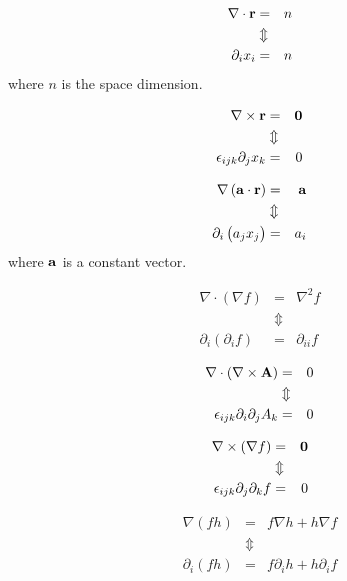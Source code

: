\begin{eqnarray}
\nabla\cdot\mathbf{ r} & = & n\nonumber \\
 & \Updownarrow\\
\partial_{i}x_{i} & = & n\nonumber
\end{eqnarray}
where $n$ is the space dimension.


\begin{eqnarray}
\nabla\times\mathbf{ r} & = & \mathbf{ 0}\nonumber \\
 & \Updownarrow\\
\epsilon_{ijk}\partial_{j}x_{k} & = & 0\nonumber
\end{eqnarray}



\begin{eqnarray}
\nabla\left(\mathbf{ a}\cdot\mathbf{ r}\right) & = & \mathbf{ a}\nonumber \\
 & \Updownarrow\\
\partial_{i}\left(a_{j}x_{j}\right) & = & a_{i}\nonumber
\end{eqnarray}
where $\mathbf{ a}$ is a constant vector.


\begin{eqnarray}
\nabla\cdot\left(\nabla f\right) & = & \nabla^{2}f\nonumber \\
 & \Updownarrow\\
\partial_{i}\left(\partial_{i}f\right) & = & \partial_{ii}f\nonumber
\end{eqnarray}



\begin{eqnarray}
\nabla\cdot\left(\nabla\times\mathbf{ A}\right) & = & 0\nonumber \\
 & \Updownarrow\\
\epsilon_{ijk}\partial_{i}\partial_{j}A_{k} & = & 0\nonumber
\end{eqnarray}



\begin{eqnarray}
\nabla\times\left(\nabla f\right) & = & \mathbf{ 0}\nonumber \\
 & \Updownarrow\\
\epsilon_{ijk}\partial_{j}\partial_{k}f & = & 0\nonumber
\end{eqnarray}



\begin{eqnarray}
\nabla\left(fh\right) & = & f\nabla h+h\nabla f\nonumber \\
 & \Updownarrow\\
\partial_{i}\left(fh\right) & = & f\partial_{i}h+h\partial_{i}f\nonumber
\end{eqnarray}



